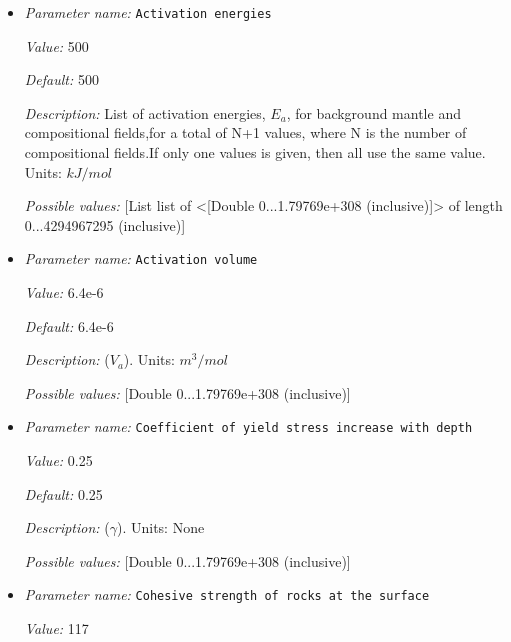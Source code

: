 \begin{itemize}
\item {\it Parameter name:} {\tt Activation energies}
\label{parameters:Material model/Morency and Doin/Activation energies}


{\it Value:} 500


{\it Default:} 500


{\it Description:} List of activation energies, $E_a$, for background mantle and compositional fields,for a total of N+1 values, where N is the number of compositional fields.If only one values is given, then all use the same value.  Units: $kJ / mol$


{\it Possible values:} [List list of <[Double 0...1.79769e+308 (inclusive)]> of length 0...4294967295 (inclusive)]
\item {\it Parameter name:} {\tt Activation volume}
\label{parameters:Material model/Morency and Doin/Activation volume}


{\it Value:} 6.4e-6


{\it Default:} 6.4e-6


{\it Description:} ($V_a$). Units: $m^3 / mol$


{\it Possible values:} [Double 0...1.79769e+308 (inclusive)]
\item {\it Parameter name:} {\tt Coefficient of yield stress increase with depth}
\label{parameters:Material model/Morency and Doin/Coefficient of yield stress increase with depth}


{\it Value:} 0.25


{\it Default:} 0.25


{\it Description:} ($\gamma$). Units: None


{\it Possible values:} [Double 0...1.79769e+308 (inclusive)]
\item {\it Parameter name:} {\tt Cohesive strength of rocks at the surface}
\label{parameters:Material model/Morency and Doin/Cohesive strength of rocks at the surface}


{\it Value:} 117



\end{itemize}
